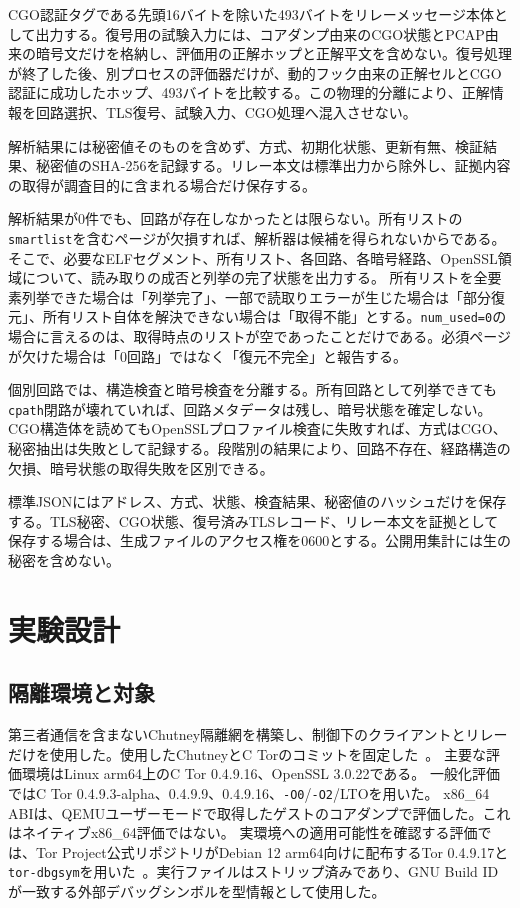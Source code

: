 \documentclass[10pt,a4paper]{ltjsarticle}
\newcommand{\code}[1]{\nolinkurl{#1}}
\begin{document}
CGO認証タグである先頭16バイトを除いた493バイトをリレーメッセージ本体として出力する。復号用の試験入力には、コアダンプ由来のCGO状態とPCAP由来の暗号文だけを格納し、評価用の正解ホップと正解平文を含めない。復号処理が終了した後、別プロセスの評価器だけが、動的フック由来の正解セルとCGO認証に成功したホップ、493バイトを比較する。この物理的分離により、正解情報を回路選択、TLS復号、試験入力、CGO処理へ混入させない。

解析結果には秘密値そのものを含めず、方式、初期化状態、更新有無、検証結果、秘密値のSHA-256を記録する。リレー本文は標準出力から除外し、証拠内容の取得が調査目的に含まれる場合だけ保存する。


解析結果が0件でも、回路が存在しなかったとは限らない。所有リストの\code{smartlist}を含むページが欠損すれば、解析器は候補を得られないからである。
そこで、必要なELFセグメント、所有リスト、各回路、各暗号経路、OpenSSL領域について、読み取りの成否と列挙の完了状態を出力する。
所有リストを全要素列挙できた場合は「列挙完了」、一部で読取りエラーが生じた場合は「部分復元」、所有リスト自体を解決できない場合は「取得不能」とする。\code{num_used=0}の場合に言えるのは、取得時点のリストが空であったことだけである。必須ページが欠けた場合は「0回路」ではなく「復元不完全」と報告する。

個別回路では、構造検査と暗号検査を分離する。所有回路として列挙できても\code{cpath}閉路が壊れていれば、回路メタデータは残し、暗号状態を確定しない。CGO構造体を読めてもOpenSSLプロファイル検査に失敗すれば、方式はCGO、秘密抽出は失敗として記録する。段階別の結果により、回路不存在、経路構造の欠損、暗号状態の取得失敗を区別できる。

標準JSONにはアドレス、方式、状態、検査結果、秘密値のハッシュだけを保存する。TLS秘密、CGO状態、復号済みTLSレコード、リレー本文を証拠として保存する場合は、生成ファイルのアクセス権を0600とする。公開用集計には生の秘密を含めない。

\section{実験設計}\label{sec:experiment}

\subsection{隔離環境と対象}

第三者通信を含まないChutney隔離網を構築し、制御下のクライアントとリレーだけを使用した。使用したChutneyとC Torのコミットを固定した~\cite{chutneysource,ctorsource04916}。
主要な評価環境はLinux arm64上のC Tor 0.4.9.16、OpenSSL 3.0.22である。
一般化評価ではC Tor 0.4.9.3-alpha、0.4.9.9、0.4.9.16、\code{-O0}/\code{-O2}/LTOを用いた。
x86\_64 ABIは、QEMUユーザーモードで取得したゲストのコアダンプで評価した。これはネイティブx86\_64評価ではない。
実環境への適用可能性を確認する評価では、Tor Project公式リポジトリがDebian 12 arm64向けに配布するTor 0.4.9.17と\code{tor-dbgsym}を用いた~\cite{torpackage04917}。実行ファイルはストリップ済みであり、GNU Build IDが一致する外部デバッグシンボルを型情報として使用した。
\end{document}
